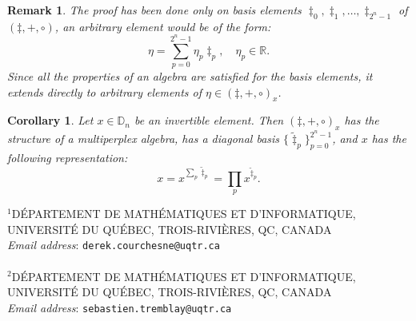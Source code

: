 \documentclass{article}
\newtheorem{corollary}[theorem]{Corollary}
\newtheorem{remark}[theorem]{Remark}
\begin{document}
\begin{remark}
    The proof has been done only on basis elements $\ddagger_0,\ddagger_1,\ldots,\ddagger_{2^n-1}$ of $(\ddagger, +, \circ)$, an arbitrary element would be of the form:
    $$ \eta = \sum_{p=0}^{2^n-1} \eta_p \ddagger_p, \quad \eta_p \in \mathbb{R}. $$
    Since all the properties of an algebra are satisfied for the basis elements, it extends directly to arbitrary elements of $\eta \in (\ddagger, +, \circ)_x$.
\end{remark}
\begin{corollary}
    Let $x \in \mathbb{D}_n$ be an invertible element. Then $(\ddagger, +, \circ)_x$ has the structure of a multiperplex algebra, has a diagonal basis $\{ \tilde \ddagger_p \}_{p=0}^{2^n-1}$, and $x$ has the following representation:
    $$ x = x^{\sum_p \tilde \ddagger_p} = \prod_p x^{\tilde \ddagger_p}. $$
\end{corollary}




\vspace*{1cm}

\noindent $^1$D\'EPARTEMENT DE MATHÉMATIQUES ET D'INFORMATIQUE, \\ UNIVERSITÉ DU QUÉBEC, TROIS-RIVI\`ERES, QC, CANADA \\
{\em Email address}: \texttt{derek.courchesne@uqtr.ca} \\
\\
\noindent $^2$D\'EPARTEMENT DE MATHÉMATIQUES ET D'INFORMATIQUE, \\ UNIVERSITÉ DU QUÉBEC, TROIS-RIVI\`ERES, QC, CANADA \\
{\em Email address}: \texttt{sebastien.tremblay@uqtr.ca}\\
\end{document}
